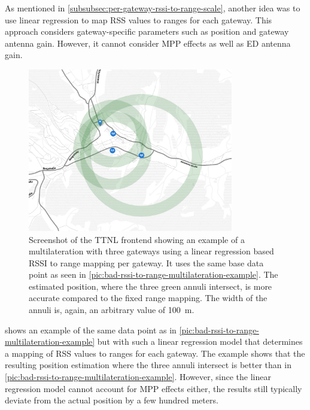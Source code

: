 As mentioned in \cref{subsubsec:per-gateway-rssi-to-range-scale}, another idea was to use linear regression to map \ac{RSS} values to ranges for each gateway.
This approach considers gateway-specific parameters such as position and gateway antenna gain.
However, it cannot consider \ac{MPP} effects as well as \acl{ED} antenna gain.

\begin{figure}[htbp]
    \centering
    \includegraphics[width=0.8\textwidth]{pictures/ttn-locator/frontend/multilateration/rssi_range_multilateration_regression_example.png}
    \caption{
        Screenshot of the \ac{TTNL} frontend showing an example of a multilateration with three gateways using a linear regression based \ac{RSSI} to range mapping per gateway.
        It uses the same base data point as seen in \cref{pic:bad-rssi-to-range-multilateration-example}.
        The estimated position, where the three green annuli intersect, is more accurate compared to the fixed range mapping.
        The width of the annuli is, again, an arbitrary value of \SI{100}{\meter}.
    }\label{pic:rssi-to-range-multilateration-example-with-linear-regression}
\end{figure}

 shows an example of the same data point as in \cref{pic:bad-rssi-to-range-multilateration-example} but with such a linear regression model that determines a mapping of \ac{RSS} values to ranges for each gateway.
The example shows that the resulting position estimation where the three annuli intersect is better than in \cref{pic:bad-rssi-to-range-multilateration-example}.
However, since the linear regression model cannot account for \ac{MPP} effects either, the results still typically deviate from the actual position by a few hundred meters.

